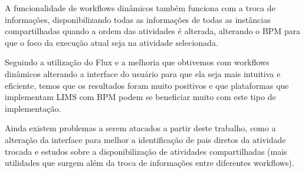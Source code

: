 A funcionalidade de workflows dinâmicos também funciona com a troca de informações, disponibilizando todas as informações de todas as instâncias compartilhadas quando a ordem das atividades é alterada, alterando o BPM para que o foco da execução atual seja na atividade selecionada.

Seguindo a utilização do Flux e a melhoria que obtivemos com workflows dinâmicos alterando a interface do usuário para que ela seja mais intuitiva e eficiente, temos que os resultados foram muito positivos e que plataformas que implementam LIMS com BPM podem se beneficiar muito com este tipo de implementação.

Ainda existem problemas a serem atacados a partir deste trabalho, como a alteração da interface para melhor a identificação de pais diretos da atividade trocada e estudos sobre a disponibilização de atividades compartilhadas (mais utilidades que surgem além da troca de informações entre diferentes workflows).